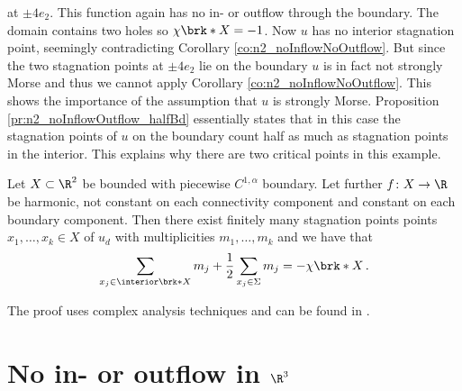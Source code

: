 \begin{example}
  at $\pm4e_2$.
  This function again has no in- or outflow through the boundary. The domain contains
  two holes so $\chi\brk*{X}=-1$. Now $u$ has no interior stagnation point, seemingly contradicting
  Corollary \ref{co:n2_noInflowNoOutflow}. But since the two stagnation points
  at $\pm4e_2$ lie on the boundary $u$ is in fact not strongly Morse and thus we cannot apply Corollary \ref{co:n2_noInflowNoOutflow}.
  This shows the importance of the assumption that $u$ is strongly Morse.
  Proposition \ref{pr:n2_noInflowOutflow_halfBd}
  essentially states that in this case the stagnation points of $u$ on the boundary
  count half as much as stagnation points in the interior.
  This explains why there are two critical points in this example.
\end{example}

\begin{proposition}\label{pr:n2_noInflowOutflow_halfBd}
  Let $X\subset\R^2$ be bounded with piecewise $C^{1,\alpha}$ boundary.
  Let further $f\colon X\to\R$ be harmonic, not constant on each connectivity component 
  and constant on each boundary component. Then there exist finitely many stagnation points
  points $x_1,\dots,x_k\in X$ of $u_d$ with multiplicities $m_1,\dots,m_k$ and we have that
  \begin{align*}
    \sum_{x_j\in\openX}m_j+\frac{1}{2}\sum_{x_j\in \Sigma}m_j=-\chi\brk*{X}\,.
  \end{align*}
\end{proposition}
  The proof uses complex analysis techniques and can be found in \cite{Alessandrini1992}.

\section{No in- or outflow in $\R^3$}

